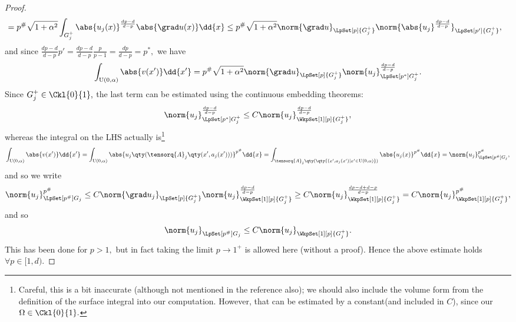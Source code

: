 \begin{proof}
\begin{align*}
								& = p^{\#}\sqrt{1+\alpha^{2}}\int_{G_j^{+}}\abs{u_j(x)}^{\frac{dp-d}{d-p}}\abs{\grad u(x)}\dd{x} \leq p^{\#}\sqrt{1+\alpha^{2}} \norm{\grad u}_{\LpSet[p]{G_j^+}} \norm{\abs{u_j}^{\frac{dp-d}{d-p}}}_{\LpSet[p']{G_j^{+}}},
	\end{align*}
	and since $\frac{dp-d}{d-p} p' = \frac{dp-d}{d-p} \frac{p}{p-1} = \frac{dp}{d-p} = p^{*},$ we have	
	\[
		\int_{\text{U}(0,\alpha)}\abs{v(x')}\dd{x'} = p^{\#}\sqrt{1+\alpha^{2}}\norm{\grad u}_{\LpSet[p]{G_j^{+}}}\norm{u_j}_{\LpSet[p^{*}]{G_j^{+}}}^{\frac{dp-d}{d-p}}.
	\]
	Since $G_j^{+} \in \Ckl{0}{1},$ the last term can be estimated using the continuous embedding theorems:
	\[
		\norm{u_j}_{\LpSet[p^{*}]{G_j^+}}^{\frac{dp-d}{d-p}} \leq C \norm{u_j}_{\WkpSet[1][p]{G_j^+}}^{\frac{dp-d}{d-p}},
	\]
	whereas the integral on the LHS actually is\footnote{Careful, this is a bit inaccurate (although not mentioned in the reference also); we should also include the volume form from the definition of the surface integral into our computation. However, that can be estimated by a constant(and included in $C$), since our $\Omega \in \Ckl{0}{1}.$}
	\[
		\int_{\text{U}(0,\alpha)}\abs{v(x')}\dd{x'} = \int_{\text{U}(0,\alpha)}\abs{u_j\qty(\tensorq{A}_j\qty(x',a_j(x')))}^{p^{\#}}\dd{x} = \int_{\tensorq{A}_j\qty(\qty{(x',a_j(x')|x' \in \text{U}(0,\alpha)})}\abs{u_j(x)}^{p^{\#}}\dd{x} = \norm{u_j}_{\LpSet[p^{\#}]{G_j}}^{p^{\#}}, 
	\]
	and so we write
	\[
		\norm{u_j}_{\LpSet[p^{\#}]{G_j}}^{p^{\#}}\leq C \norm{\grad u_j}_{\LpSet[p]{G_j^+}} \norm{u_j}_{\WkpSet[1][p]{G_j^+}}^{\frac{dp-d}{d-p}} \geq C \norm{u_j}_{\WkpSet[1][p]{G_j^+}}^\frac{dp-d+d-p}{d-p} = C \norm{u_j}_{\WkpSet[1][p]{G^+_j}}^{p^{\#}},
	\]
	and so
	\[
		\norm{u_j}_{\LpSet[p^{\#}]{G_j}}\leq C \norm{u_j}_{\WkpSet[1][p]{G_j^+}}.
	\]
	This has been done for $p>1,$ but in fact taking the limit $p \to 1^+$ is allowed here (without a proof). Hence the above estimate holds $\forall p \in [1,d).$


\end{proof}
